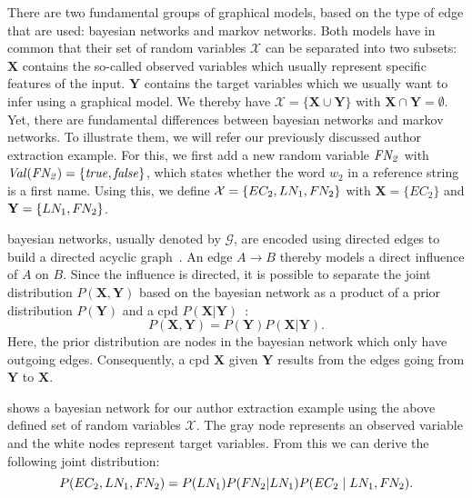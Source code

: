 There are two fundamental groups of graphical models, based on the type of edge that are used: \glspl{bayesian network} and \glspl{markov network}.
Both models have in common that their set of \glspl{random variable} $\mathcal{X}$ can be separated into two subsets:
$\mathbf{X}$ contains the so-called \glspl{observed variable} which usually represent specific features of the input.
$\mathbf{Y}$ contains the \glspl{target variable} which we usually want to infer using a graphical model.
We thereby have $\mathcal{X}=\{\mathbf{X}\cup\mathbf{Y}\}$ with $\mathbf{X}\cap\mathbf{Y}=\emptyset$.
Yet, there are fundamental differences between \glspl{bayesian network} and \glspl{markov network}.
To illustrate them, we will refer our previously discussed author extraction example.
For this, we first add a new \gls{random variable} $\mathit{F\hspace{-0.07em} N_2}$ with $\mathit{Val}(\mathit{F\hspace{-0.07em} N_2})=\{\mathit{true},\mathit{false}\}$, which states whether the word $w_2$ in a reference string is a first name.
Using this, we define $\mathcal{X}=\{EC_2,LN_1,F\hspace{-0.07em} N_2\}$ with $\mathbf{X}=\{EC_2\}$ and $\mathbf{Y}=\{LN_1,F\hspace{-0.07em} N_2\}$.


\bigskip

\Glspl{bayesian network}, usually denoted by $\mathcal{G}$, are encoded using directed \glspl{edge} to build a directed acyclic graph~\citep{koller2009probabilistic}.
An \gls{edge} $A\to B$ thereby models a direct influence of $A$ on $B$.
Since the influence is directed, it is possible to separate the \gls{joint distribution} $P(\mathbf{X},\mathbf{Y})$ based on the \gls{bayesian network} as a product of a \gls{prior distribution} $P(\mathbf{Y})$ and a \gls{cpd} $P(\mathbf{X}|\mathbf{Y})$~\citep{sutton2010introduction}:
\begin{equation}
  P(\mathbf{X},\mathbf{Y})=P(\mathbf{Y})P(\mathbf{X}|\mathbf{Y}).
\end{equation}
Here, the \gls{prior distribution} are \glspl{node} in the \gls{bayesian network} which only have outgoing \glspl{edge}.
Consequently, a \gls{cpd} $\mathbf{X}$ given $\mathbf{Y}$ results from the \glspl{edge} going from $\mathbf{Y}$ to $\mathbf{X}$.

 shows a \gls{bayesian network} for our author extraction example using the above defined set of \glspl{random variable} $\mathcal{X}$.
The gray node represents an \gls{observed variable} and the white nodes represent \glspl{target variable}.
From this we can derive the following \gls{joint distribution}:
\begin{equation*}
  P(EC_2,LN_1,F\hspace{-0.07em} N_2)=P(LN_1)P(F\hspace{-0.07em} N_2|LN_1)P(EC_2\mid LN_1,F\hspace{-0.07em} N_2).
\end{equation*}

